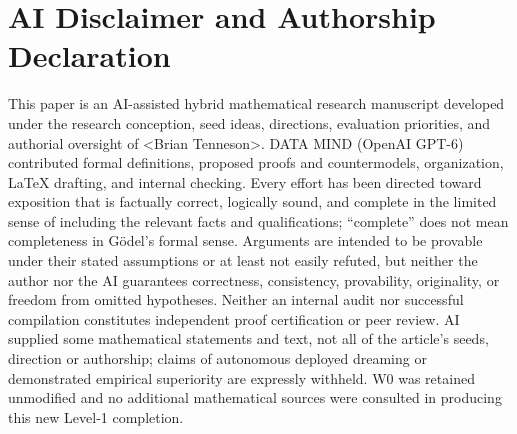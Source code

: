 \documentclass[11pt,letterpaper]{article}
\begin{document}
\section*{AI Disclaimer and Authorship Declaration}
This paper is an AI-assisted hybrid mathematical research manuscript developed under the research conception, seed ideas, directions, evaluation priorities, and authorial oversight of \textless Brian Tenneson\textgreater. DATA MIND (OpenAI GPT-6) contributed formal definitions, proposed proofs and countermodels, organization, LaTeX drafting, and internal checking. Every effort has been directed toward exposition that is factually correct, logically sound, and complete in the limited sense of including the relevant facts and qualifications; ``complete'' does not mean completeness in G\"odel's formal sense. Arguments are intended to be provable under their stated assumptions or at least not easily refuted, but neither the author nor the AI guarantees correctness, consistency, provability, originality, or freedom from omitted hypotheses. Neither an internal audit nor successful compilation constitutes independent proof certification or peer review. AI supplied some mathematical statements and text, not all of the article's seeds, direction or authorship; claims of autonomous deployed dreaming or demonstrated empirical superiority are expressly withheld. W0 was retained unmodified and no additional mathematical sources were consulted in producing this new Level-1 completion.
\end{document}
